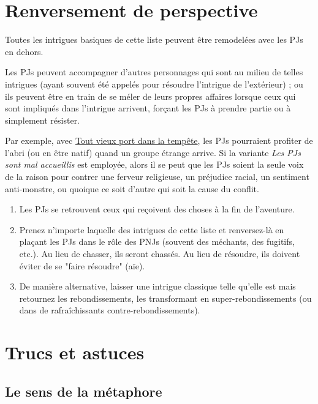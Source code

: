\begin{multicols}{2}
\section{Renversement de perspective}
\label{renversement}


Toutes les intrigues basiques de cette liste peuvent être remodelées avec les PJs en dehors.

Les PJs peuvent accompagner d'autres personnages qui sont au milieu de telles intrigues (ayant souvent été appelés pour résoudre l'intrigue de l'extérieur) ; ou ils peuvent être en train de se méler de leurs propres affaires lorsque ceux qui sont impliqués dans l'intrigue arrivent, forçant les PJs à prendre partie ou à simplement résister.

Par exemple, avec \hyperref[port]{Tout vieux port dans la tempête}, les PJs pourraient profiter de l'abri (ou en être natif) quand un groupe étrange arrive. Si la variante \emph{Les PJs sont mal accueillis} est employée, alors il se peut que les PJs soient la seule voix de la raison pour contrer une ferveur religieuse, un préjudice racial, un sentiment anti-monstre, ou quoique ce soit d'autre qui soit la cause du conflit.

\themes
\begin{enumerate}
\item Les PJs se retrouvent ceux qui reçoivent des choses à la fin de l'aventure.
\item Prenez n'importe laquelle des intrigues de cette liste et renversez-là en plaçant les PJs dans le rôle des PNJs (souvent des méchants, des fugitifs, etc.). Au lieu de chasser, ils seront chassés. Au lieu de résoudre, ils doivent éviter de se "faire résoudre" (aïe).
\item De manière alternative, laisser une intrigue classique telle qu'elle est mais retournez les rebondissements, les transformant en super-rebondissements (ou dans de rafraîchissants contre-rebondissements).
\end{enumerate}

\section*{Trucs et astuces}

\subsection*{Le sens de la métaphore}


\end{multicols}
